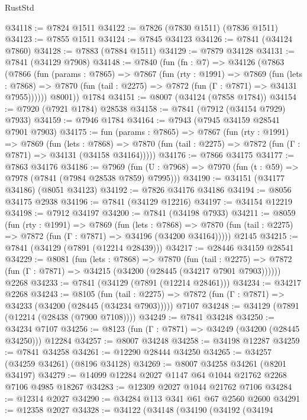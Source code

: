 \begin{lexlean}{RustStd}
\begin{coremodule}
@34118 := @7824 @1511
@34122 := @7826 (@7830 @1511) (@7836 @1511)
@34123 := @7855 @1511
@34124 := @7845 @34123
@34126 := @7841 (@34124 @7860)
@34128 := @7883 (@7884 @1511)
@34129 := @7879 @34128
@34131 := @7841 (@34129 @7908)
@34148 := @7840
    (fun (fn : @7) =>
    @34126
      (@7863
        (@7866
          (fun (params : @7865) =>
          @7867
            (fun (rty : @1991) =>
            @7869
              (fun (lets : @7868) =>
              @7870 (fun (tail : @2275) => @7872 (fun (Γ : @7871) => @34131 @7955))))))
        @8001))
    @1784
@34151 := @8007 (@34124 (@7858 @1784))
@34154 := @7920 (@7921 @1784) @28538
@34158 := @7841 (@7912 (@34154 @7929) @7933)
@34159 := @7946 @1784
@34164 := @7943 (@7945 @34159 @28541 @7901 @7903)
@34175 := fun (params : @7865) =>
  @7867
    (fun (rty : @1991) =>
    @7869
      (fun (lets : @7868) =>
      @7870 (fun (tail : @2275) => @7872 (fun (Γ : @7871) => @34131 (@34158 @34164)))))
@34176 := @7866 @34175
@34177 := @7863 @34176
@34186 := @7969
    (fun (U : @7968) => @7970 (fun (t : @59) => @7978 (@7841 (@7984 @28538 @7859) @7995)))
@34190 := @34151 (@34177 @34186) (@8051 @34123)
@34192 := @7826 @34176 @34186
@34194 := @8056 @34175 @2938
@34196 := @7841 (@34129 @12216)
@34197 := @34154 @12219
@34198 := @7912 @34197
@34200 := @7841 (@34198 @7933)
@34211 := @8059
    (fun (rty : @1991) =>
    @7869
      (fun (lets : @7868) =>
      @7870 (fun (tail : @2275) => @7872 (fun (Γ : @7871) => @34196 (@34200 @34164)))))
    @2145
@34215 := @7841 (@34129 (@7891 (@12214 @28439)))
@34217 := @28446 @34159 @28541
@34229 := @8081
    (fun (lets : @7868) =>
    @7870
      (fun (tail : @2275) =>
      @7872 (fun (Γ : @7871) => @34215 (@34200 (@28445 (@34217 @7901 @7903))))))
    @2268
@34233 := @7841 (@34129 (@7891 (@12214 @28461)))
@34234 := @34217 @2268
@34243 := @8105
    (fun (tail : @2275) => @7872 (fun (Γ : @7871) => @34233 (@34200 (@28445 (@34234 @7903)))))
    @7107
@34248 := @34129 (@7891 (@12214 (@28438 (@7900 @7108))))
@34249 := @7841 @34248
@34250 := @34234 @7107
@34256 := @8123 (fun (Γ : @7871) => @34249 (@34200 (@28445 @34250))) @12284
@34257 := @8007 @34248
@34258 := @34198 @12287
@34259 := @7841 @34258
@34261 := @12290 @28444 @34250
@34265 := @34257 (@34259 @34261) (@8196 @34128)
@34269 := @8007 @34258 @34261 (@8201 @34197)
@34279 := @14099 @12284 @2027 @1147 @64 @1044 @21762 @2268 @7106 @4985 @18267
@34283 := @12309 @2027 @1044 @21762 @7106
@34284 := @12314 @2027
@34290 := @34284 @113 @341 @61 @67 @2560 @2600
@34291 := @12358 @2027
@34328 := @34122
    (@34148
      (@34190
        (@34192
          (@34194

\end{coremodule}
\end{lexlean}
